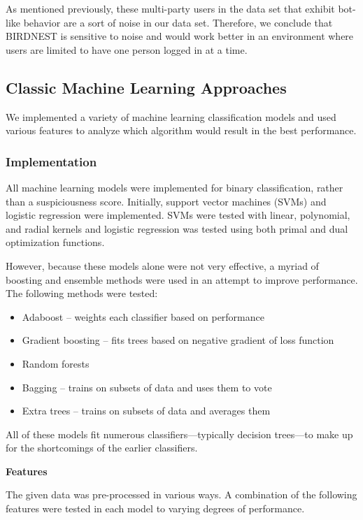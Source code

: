 \documentclass{article} %
\begin{document}
As mentioned previously, these multi-party users in the data set that exhibit bot-like behavior are a sort of noise in our data set. Therefore, we conclude that BIRDNEST is sensitive to noise and would work better in an environment where users are limited to have one person logged in at a time.

\subsection{Classic Machine Learning Approaches}

We implemented a variety of machine learning classification models and used various features to analyze which algorithm would result in the best performance.

\subsubsection{Implementation}

All machine learning models were implemented for binary classification, rather than a suspiciousness score.
Initially, support vector machines (SVMs) and logistic regression were implemented.
SVMs were tested with linear, polynomial, and radial kernels and logistic regression was tested using both primal and dual optimization functions.

However, because these models alone were not very effective, a myriad of boosting and ensemble methods were used in an attempt to improve performance.
The following methods were tested:

\begin{itemize}
\item Adaboost -- weights each classifier based on performance
\item Gradient boosting -- fits trees based on negative gradient of loss function
\item Random forests
\item Bagging -- trains on subsets of data and uses them to vote
\item Extra trees -- trains on subsets of data and averages them
\end{itemize}

All of these models fit numerous classifiers---typically decision trees---to make up for the shortcomings of the earlier classifiers.

\textbf{Features}

The given data was pre-processed in various ways.
A combination of the following features were tested in each model to varying degrees of performance.
\end{document}
